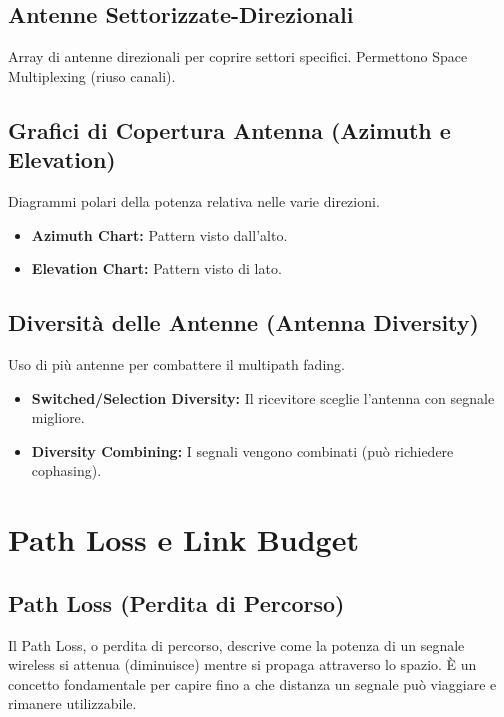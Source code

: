 \subsection{Antenne Settorizzate-Direzionali}
Array di antenne direzionali per coprire settori specifici. Permettono Space Multiplexing (riuso canali).

\subsection{Grafici di Copertura Antenna (Azimuth e Elevation)}
Diagrammi polari della potenza relativa nelle varie direzioni.
\begin{itemize}
    \item \textbf{Azimuth Chart:} Pattern visto dall'alto.
    \item \textbf{Elevation Chart:} Pattern visto di lato.
\end{itemize}

\subsection{Diversità delle Antenne (Antenna Diversity)}
Uso di più antenne per combattere il multipath fading.
\begin{itemize}
    \item \textbf{Switched/Selection Diversity:} Il ricevitore sceglie l'antenna con segnale migliore.
    \item \textbf{Diversity Combining:} I segnali vengono combinati (può richiedere cophasing).
\end{itemize}

\section{Path Loss e Link Budget}

\subsection{Path Loss (Perdita di Percorso)}
Il Path Loss, o perdita di percorso, descrive come la potenza di un segnale wireless si attenua (diminuisce) mentre si propaga attraverso lo spazio. È un concetto fondamentale per capire fino a che distanza un segnale può viaggiare e rimanere utilizzabile.

